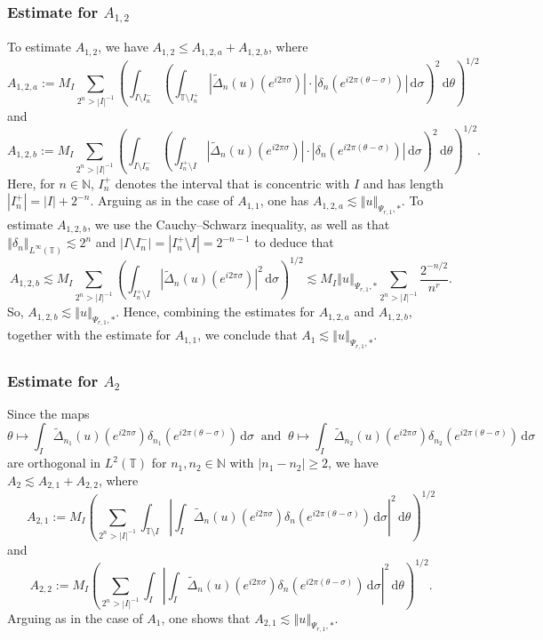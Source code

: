 \documentclass[a4paper, leqno, 10pt]{amsart}
\numberwithin{equation}{section}
\newcommand{\dd}{\mathrm{d}}
\newcommand{\T}{\mathbb{T}}
\newcommand{\norm}[1]{\left\Vert#1\right\Vert}
\newcommand{\abs}[1]{\left|#1\right|}
\newcommand{\N}{\mathbb{N}}
\begin{document}
%
\subsubsection*{Estimate for $A_{1,2}$}
%
To estimate $A_{1,2}$, we have $A_{1,2} \leq A_{1,2,a} + A_{1,2,b}$, where
%
\[ A_{1,2,a}  :=  
M_I \sum_{ 2^n > | I |^{-1} } \left( \int_{ I \setminus I_n^-} \left( \int_{\T \setminus I_n^+} \abs{ \widetilde{\Delta}_n (u) (e^{i 2 \pi \sigma}) } \cdot \abs{ \delta_n \left( e^{i 2 \pi (\theta - \sigma )  } \right) }  \, \dd \sigma  \right)^2 \, \dd \theta \right)^{1/2}
\]
%
and
\[
A_{1,2,b}  := 
M_I \sum_{ 2^n > | I |^{-1} } \left( \int_{ I \setminus I_n^-} \left( \int_{I_n^+ \setminus I} \abs{ \widetilde{\Delta}_n (u) (e^{i 2 \pi \sigma}) } \cdot \abs{ \delta_n \left( e^{i 2 \pi (\theta - \sigma )  } \right) }  \, \dd \sigma  \right)^2 \, \dd \theta \right)^{1/2} .
\]
%
Here, for $n \in \N$, $I_n^+$ denotes the interval that is concentric with $I$ and has length $| I_n^+ | =  | I | + 2^{-n}$. Arguing as in the case of $A_{1,1}$, one has
$A_{1,2,a} \lesssim \norm{u}_{\Psi_{r,1}, \ast} $. To estimate $A_{1,2,b} $, we use the Cauchy--Schwarz inequality, as well as that $\norm{\delta_n}_{L^{\infty}(\T)} \lesssim  2^n$ and $| I \setminus I_n^-| = | I_n^+ \setminus I  | = 2^{-n-1} $ to deduce that
\[
A_{1,2,b}  \lesssim  M_I \sum_{ 2^n > | I |^{-1} }   \left( \int_{ I_n^+ \setminus I } \abs{ \widetilde{\Delta}_n (u) (e^{i 2 \pi \sigma}) }^2 \, \dd \sigma  \right)^{1/2} \lesssim  M_I  \norm{u}_{\Psi_{r,1}, \ast}  \sum_{ 2^n > | I |^{-1} }  \frac{ 2^{-n/2} } {n^r}.
\]
So, $
A_{1,2,b} \lesssim   \norm{u}_{\Psi_{r,1}, \ast} $. 
Hence, combining the estimates for $A_{1,2,a}$ and $A_{1,2,b}$, together with the estimate for $A_{1,1}$, we conclude that $A_1 \lesssim   \norm{u}_{\Psi_{r,1}, \ast}$.

%
\subsubsection*{Estimate for $A_2$}
%
Since the maps
\[ \theta \mapsto \int_I \widetilde{\Delta}_{n_1} (u) (e^{i 2 \pi \sigma}) \delta_{n_1} (e^{i 2 \pi ( \theta - \sigma ) }) \, \dd \sigma \  \text{ and } \ \theta \mapsto \int_I \widetilde{\Delta}_{n_2} (u) (e^{i 2 \pi \sigma}) \delta_{n_2} (e^{i 2 \pi ( \theta - \sigma ) }) \, \dd \sigma \]
are orthogonal in $L^2 (\T)$ for $n_1, n_2 \in \N$ with $| n_1 - n_2  | \geq 2$, we have $ A_2 \lesssim A_{2,1} + A_{2,2} $, where
\[
A_{2,1} := M_I \left( \sum_{ 2^n > | I |^{-1} }  \int_{\T \setminus I} \abs{ \int_I  \widetilde{\Delta}_n (u) (e^{i 2 \pi \sigma}) \delta_n \left( e^{i 2 \pi (\theta - \sigma )  } \right)   \, \dd \sigma  }^2 \, \dd \theta \right)^{1/2} 
\]
and
\[
A_{2,2} := M_I \left( \sum_{ 2^n > | I |^{-1} }  \int_I \abs{ \int_I  \widetilde{\Delta}_n (u) (e^{i 2 \pi \sigma}) \delta_n \left( e^{i 2 \pi (\theta - \sigma )  } \right)   \, \dd \sigma  }^2 \, \dd \theta \right)^{1/2} .
\]
Arguing as in the case of  $A_1$, one shows that $A_{2,1} \lesssim \norm{u}_{\Psi_{r,1}, \ast}$.  
\end{document}
